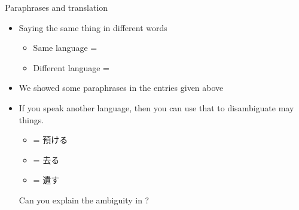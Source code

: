 \documentclass{beamer}
\begin{document}
\begin{frame}{Paraphrases and translation}

\begin{itemize}
\item Saying the same thing in different words
  \begin{itemize}
  \item Same language = 
  \item Different language = 
  \end{itemize}
\item We showed some paraphrases in the entries given above
\item If you speak another language, then you can use that to
  disambiguate may things.
  \begin{itemize}
  \item {} = 預ける 
  \item {} = 去る 
  \item {} = 遺す 
  \end{itemize}
  \begin{taskb}
    Can you explain the ambiguity in ?
  \end{taskb}
\end{itemize}
\end{frame}


\end{document}
